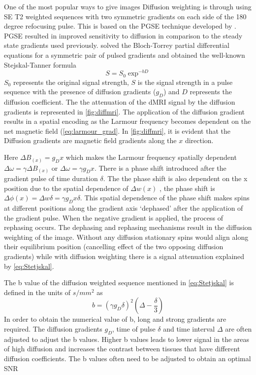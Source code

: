 \documentclass[msthesis.tex]{subfiles}
\begin{document}
One of the most popular ways to give images Diffusion weighting is through using \gls{SE} T2 weighted sequences with two symmetric gradients on each side of the 180 degree refocusing pulse. This is based on the \gls{PGSE} technique developed by \cite{stejskal1965spin}. PGSE resulted in improved sensitivity to diffusion in comparison to the steady state gradients used previously. \cite{stejskal1965spin} solved the Bloch-Torrey \citep{bloch1946nuclear} partial differential equations for a symmetric pair of pulsed gradients and obtained the well-known Stejskal-Tanner formula
\begin{equation}
\label{eq:Stetjskal}
S = S_0 \exp^{-bD}
\end{equation}
$S_0$ represents the original signal strength, $S$ is the signal strength in a pulse sequence with the presence of diffusion gradients ($g_D$) and $D$ represents the diffusion coefficient. The the attenuation of the \gls{dMRI} signal by the diffusion gradients is represented in \autoref{fig:diffmri}. The application of the diffusion gradient results in a spatial encoding as the Larmour frequency becomes dependent on the net magnetic field (\autoref{eq:larmour_grad}. In \autoref{fig:diffmri}, it is evident that the Diffusion gradients are magnetic field gradients along the $x$ direction. 

Here $\Delta B_(x) = g_D x$ which makes the Larmour frequency spatially dependent $\Delta \omega = \gamma \Delta B_(x)$ or $\Delta \omega = \gamma g_D x$. There is a phase shift introduced after the gradient pulse of time duration $\delta$. The the phase shift is also dependent on the x position due to the spatial dependence of $\Delta w(x)$ , the phase shift is $\Delta \phi (x) = \Delta w \delta = \gamma g_D x \delta$. This spatial dependence of the phase shift makes spins at different positions along the gradient axis `dephased' after the application of the gradient pulse. When the negative gradient is applied, the process of rephasing occurs. The dephasing and rephasing mechanisms result in the diffusion weighting of the image. Without any diffusion stationary spins would align along their equilibrium position (cancelling effect of the two opposing diffusion gradients) while with diffusion weighting there is a signal attenuation explained by \autoref{eq:Stetjskal}. 

The b value of the diffusion weighted sequence mentioned in \autoref{eq:Stetjskal} is defined in the units of $s/mm^2$ as
\begin{equation}
    b = (\gamma g_D \delta)^2 (\Delta - \frac{\delta}{3})
\end{equation}
In order to obtain the numerical value of b, long and strong gradients are required. The diffusion gradients $g_D$, time of pulse $\delta$ and time interval $\Delta$ are often adjusted to adjust the b values. Higher b values leads to lower signal in the areas of high diffusion and increases the contrast between tissues that have different diffusion coefficients. The b values often need to be adjusted to obtain an optimal \gls{SNR}
\end{document}
